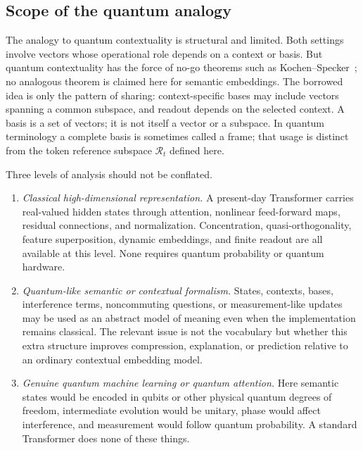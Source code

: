 \documentclass[
  aps,
  reprint,
  superscriptaddress,
  floatfix,
  nofootinbib,
  longbibliography
]{revtex4-2}
\begin{document}
\subsection{Scope of the quantum analogy}
\label{sec:quantum}

The analogy to quantum contextuality is structural and limited. Both
settings involve vectors whose operational role depends on a context or
basis.
But quantum contextuality has the force of no-go theorems such as
Kochen--Specker~\cite{specker-60,kochen1}; no analogous theorem is
claimed here for semantic embeddings. The borrowed idea is only the pattern
of sharing: context-specific bases may include vectors spanning a common
subspace, and readout depends on the selected context. A basis is a set of
vectors; it is not itself a vector or a subspace. In quantum terminology a
complete basis is sometimes called a frame; that usage is distinct from the
token reference subspace $\mathcal R_t$ defined here.

Three levels of analysis should not be conflated.
%
\begin{enumerate}
\item \emph{Classical high-dimensional representation.}
A present-day Transformer carries real-valued hidden states through
attention, nonlinear feed-forward maps, residual connections, and
normalization.  Concentration, quasi-orthogonality, feature superposition,
dynamic embeddings, and finite readout are all available at this level.
None requires quantum probability or quantum hardware.

\item \emph{Quantum-like semantic or contextual formalism.}
States, contexts, bases, interference terms, noncommuting questions, or
measurement-like updates may be used as an abstract model of meaning even
when the implementation remains classical.  The relevant issue is not the
vocabulary but whether this extra structure improves compression,
explanation, or prediction relative to an ordinary contextual embedding
model.

\item \emph{Genuine quantum machine learning or quantum attention.}
Here semantic states would be encoded in qubits or other physical quantum
degrees of freedom, intermediate evolution would be unitary, phase would
affect interference, and measurement would follow quantum probability.  A
standard Transformer does none of these things.
\end{enumerate}
%
\end{document}
